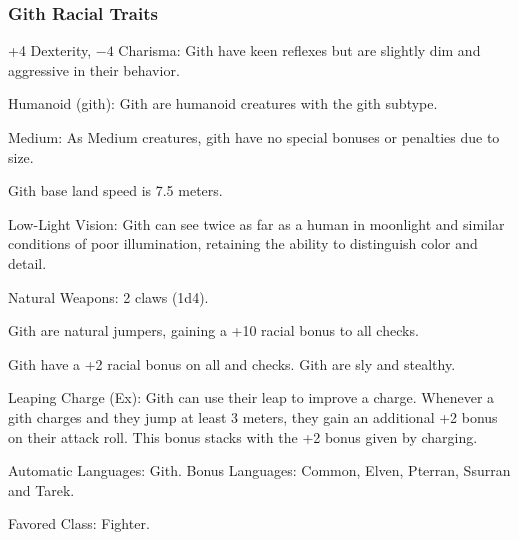 \subsubsection{Gith Racial Traits}
\begin{itemize*}
    \item +4 Dexterity, $-4$ Charisma: Gith have keen reflexes but are slightly dim and aggressive in their behavior.
    \item Humanoid (gith): Gith are humanoid creatures with the gith subtype.
    \item Medium: As Medium creatures, gith have no special bonuses or penalties due to size.
    \item Gith base land speed is 7.5 meters.

    \item Low-Light Vision: Gith can see twice as far as a human in moonlight and similar conditions of poor illumination, retaining the ability to distinguish color and detail.

    \item Natural Weapons: 2 claws (1d4).

    \item Gith are natural jumpers, gaining a +10 racial bonus to all  checks.
    \item Gith have a +2 racial bonus on all  and  checks. Gith are sly and stealthy.

    \item Leaping Charge (Ex): Gith can use their leap to improve a charge. Whenever a gith charges and they jump at least 3 meters, they gain an additional +2 bonus on their attack roll. This bonus stacks with the +2 bonus given by charging.

    \item Automatic Languages: Gith. Bonus Languages: Common, Elven, Pterran, Ssurran and Tarek.
    \item Favored Class: Fighter.
\end{itemize*}
